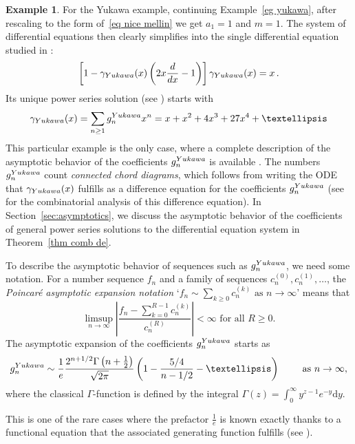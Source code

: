 \documentclass[oneside]{amsart}
\theoremstyle{definition}
\newtheorem{example}[thm]{Example}
\newcommand{\dd}{{\mathrm{d}}}
\begin{document}
\begin{example}\label{eg de}
  For the Yukawa example, continuing Example~\ref{eg yukawa}, after rescaling to the form of~\eqref{eq nice mellin} we get $a_1=1$ and $m=1$.  The system of differential equations then clearly simplifies into the single differential equation studied in \cite{bkerfc,bk30,BD}:
\[
 \left[1-\gamma_{\rm Yukawa}(x)\left(2x\frac{d}{dx}-1\right)\right]\gamma_{\rm Yukawa}(x)=x\,.
\]
Its unique power series solution (see 
\cite[\href{https://oeis.org/A000699}{A000699}]{oeis})
starts with 
%
%
\begin{eqnarray} \gamma_{\rm Yukawa}(x) = \sum_{n \geq 1} g^{\rm Yukawa}_n x^n = x +x^2 +4 x^3+27 x^4+\dots   \label{eq:hopfm1} \end{eqnarray}
This particular example is the only case, where a complete description of the asymptotic behavior of the coefficients $g^{\rm Yukawa}_n$ is available \cite{Bgenfun,BD}. 
The numbers $g^{\rm Yukawa}_n$ count {\it connected chord diagrams}, which follows from writing the ODE 
that $\gamma_{\rm Yukawa}(x)$ fulfills as a difference equation for the coefficients $g^{\rm Yukawa}_n$ (see \cite{NWchord} for the combinatorial analysis of this difference equation).
In Section~\ref{sec:asymptotics}, we discuss the asymptotic behavior of the coefficients of general power series solutions to the differential equation system in Theorem~\ref{thm comb de}. 

To describe the asymptotic behavior of sequences such as $g^{\rm Yukawa}_n$, we need some notation. For a number sequence $f_n$ and a family of sequences $c_n^{(0)},c_n^{(1)},\ldots$, the \emph{Poincar\'e asymptotic expansion notation}
`$ f_n \sim \sum_{k \geq 0} c_n^{(k)} \text{ as } n\rightarrow \infty $'
means that 
$$
\limsup_{n \rightarrow \infty} \left| \frac{f_n - \sum_{k=0}^{R-1} c_n^{(k)}}{c_n^{(R)}}\right| < \infty \text{ for all } R \geq 0.
$$
The asymptotic expansion of the coefficients $g_n^{\rm Yukawa}$ starts as
\[
    g_n^{\rm Yukawa}\sim \frac{1}{e} \frac{2^{n+1/2} \Gamma\left(n+\frac{1}{2}\right)}{\sqrt{2\pi}}\left(1-\frac{5/4}{n-1/2}-\dots\right)\qquad  \text{ as } n \rightarrow \infty
,
\]
where the classical $\Gamma$-function is defined by the integral $\Gamma(z) = \int_0^\infty y^{z-1} e^{-y} \dd y$. 

%
%
This is one of the rare cases where the prefactor $\frac{1}{e}$ is known exactly thanks to 
a functional equation that the associated generating function fulfills (see \cite[\S~7.1]{Bgenfun}).

\end{example}
\end{document}
